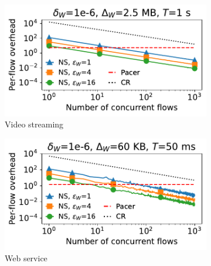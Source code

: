 \begin{figure}[t]
    \centering
    \begin{subfigure}{0.49\columnwidth}
        \centering
        \includegraphics[width=\textwidth]{overhead_vs_number_of_traces_video_bidirectional_loglog_updated_no_max.pdf}
        \caption{Video streaming}
        \label{subfig:bw-comparison-video-no-max}
    \end{subfigure}
    \hfill
    \begin{subfigure}{0.49\columnwidth}
        \centering
        \includegraphics[width=\textwidth]{overhead_vs_number_of_traces_web_bidirectional_loglog_updated_no_max.pdf}
        \caption{Web service}
        \label{subfig:bw-comparison-web-no-max}
    \end{subfigure}
    \caption{
    }
\vspace{-0.4cm}
\end{figure}


